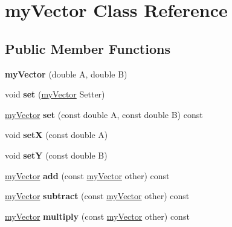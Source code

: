 \hypertarget{classmy_vector}{}\section{my\+Vector Class Reference}
\label{classmy_vector}
\subsection*{Public Member Functions}
\begin{DoxyCompactItemize}
\item 
\hypertarget{classmy_vector_a3c242231d09872ff18adcff8c5199dbd}{}{\bfseries my\+Vector} (double A, double B)\label{classmy_vector_a3c242231d09872ff18adcff8c5199dbd}

\item 
\hypertarget{classmy_vector_a14e8c2e0a550947a93cf178d50525a30}{}void {\bfseries set} (\hyperlink{classmy_vector}{my\+Vector} Setter)\label{classmy_vector_a14e8c2e0a550947a93cf178d50525a30}

\item 
\hypertarget{classmy_vector_a15d24fec4efc0a50a2648a7a54e79b4f}{}\hyperlink{classmy_vector}{my\+Vector} {\bfseries set} (const double A, const double B) const \label{classmy_vector_a15d24fec4efc0a50a2648a7a54e79b4f}

\item 
\hypertarget{classmy_vector_af5d310b4175917d94960f8d8a915583d}{}void {\bfseries set\+X} (const double A)\label{classmy_vector_af5d310b4175917d94960f8d8a915583d}

\item 
\hypertarget{classmy_vector_a67046769203977128c5869519a96981c}{}void {\bfseries set\+Y} (const double B)\label{classmy_vector_a67046769203977128c5869519a96981c}

\item 
\hypertarget{classmy_vector_ab6e4440c74a6cd118faa925a8fddedc9}{}\hyperlink{classmy_vector}{my\+Vector} {\bfseries add} (const \hyperlink{classmy_vector}{my\+Vector} other) const \label{classmy_vector_ab6e4440c74a6cd118faa925a8fddedc9}

\item 
\hypertarget{classmy_vector_a43d29af4b84766a8b27c0a6e50067ead}{}\hyperlink{classmy_vector}{my\+Vector} {\bfseries subtract} (const \hyperlink{classmy_vector}{my\+Vector} other) const \label{classmy_vector_a43d29af4b84766a8b27c0a6e50067ead}

\item 
\hypertarget{classmy_vector_a34a7a3b4eeda62cf4e8dfa5e3e79fcaa}{}\hyperlink{classmy_vector}{my\+Vector} {\bfseries multiply} (const \hyperlink{classmy_vector}{my\+Vector} other) const \label{classmy_vector_a34a7a3b4eeda62cf4e8dfa5e3e79fcaa}


\end{DoxyCompactItemize}
